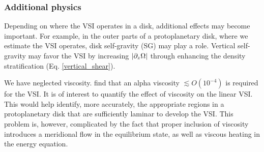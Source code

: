 \subsubsection{Additional physics} 
Depending on where the VSI operates in a
disk, additional effects may become important. For example, in the
outer parts of a protoplanetary disk, where we estimate the VSI 
operates, disk self-gravity (SG) may play a role. Vertical
self-gravity may favor the VSI by increasing $|\partial_z\Omega|$ through
enhancing the density stratification 
(Eq. \ref{vertical_shear}). %

We have neglected viscosity. \cite{nelson13} find that an 
alpha viscosity $\lesssim O(10^{-4})$ is required for the VSI. 
It is of interest to quantify the effect of viscosity 
on the linear VSI. This would help identify, more accurately, the
appropriate regions in a protoplanetary disk that are sufficiently
laminar to develop the VSI.  This problem is, however, complicated by
the fact that proper inclusion of viscosity introduces a meridional
flow in the equilibrium state, as well as viscous heating
in the energy equation. 


